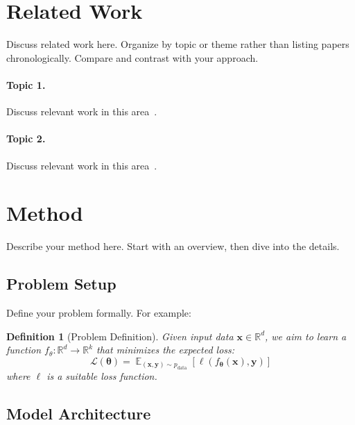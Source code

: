 \documentclass[10pt,a4paper,twocolumn]{article}
\DeclareMathOperator{\E}{\mathbb{E}}
\newcommand{\R}{\mathbb{R}}
\newcommand{\x}{\mathbf{x}}
\newcommand{\y}{\mathbf{y}}
\newcommand{\thetab}{\boldsymbol{\theta}}
\newtheorem{definition}{Definition}
\begin{document}

\section{Related Work}
\label{sec:related_work}

Discuss related work here. Organize by topic or theme rather than listing papers chronologically. Compare and contrast with your approach.

\paragraph{Topic 1.} Discuss relevant work in this area~\citep{example2020paper}.

\paragraph{Topic 2.} Discuss relevant work in this area~\citep{vaswani2017attention}.


\section{Method}
\label{sec:method}

Describe your method here. Start with an overview, then dive into the details.

\subsection{Problem Setup}
\label{sec:problem_setup}

Define your problem formally. For example:

\begin{definition}[Problem Definition]
    Given input data $\x \in \R^d$, we aim to learn a function $f_\theta: \R^d \to \R^k$ that minimizes the expected loss:
    \begin{equation}
        \mathcal{L}(\thetab) = \E_{(\x,\y) \sim p_\text{data}} \left[ \ell(f_{\thetab}(\x), \y) \right]
    \end{equation}
    where $\ell$ is a suitable loss function.
\end{definition}

\subsection{Model Architecture}
\label{sec:architecture}
\end{document}
